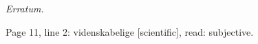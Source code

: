 \documentclass[12pt,a4paper]{book}
\begin{document}
\bigskip
\begin{center}
  \emph{Erratum.}

  \smallskip
  Page 11, line 2: videnskabelige [scientific], read: subjective.
\end{center}
\end{document}
